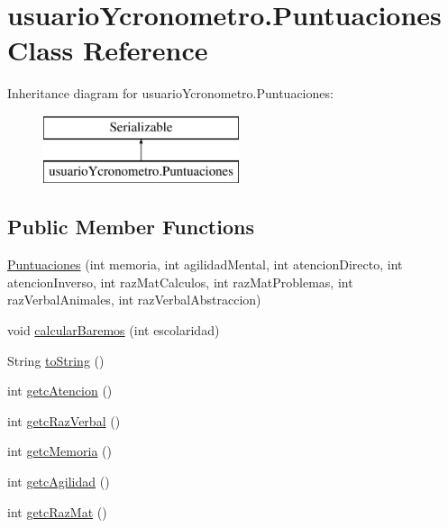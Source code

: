 \hypertarget{classusuario_ycronometro_1_1_puntuaciones}{}\section{usuario\+Ycronometro.\+Puntuaciones Class Reference}
\label{classusuario_ycronometro_1_1_puntuaciones}
Inheritance diagram for usuario\+Ycronometro.\+Puntuaciones\+:\begin{figure}[H]
\begin{center}
\leavevmode
\includegraphics[height=2.000000cm]{classusuario_ycronometro_1_1_puntuaciones}
\end{center}
\end{figure}
\subsection*{Public Member Functions}
\begin{DoxyCompactItemize}
\item 
\mbox{\hyperlink{classusuario_ycronometro_1_1_puntuaciones_ab9b472fcb079cdeb1530c335e5e56ddc}{Puntuaciones}} (int memoria, int agilidad\+Mental, int atencion\+Directo, int atencion\+Inverso, int raz\+Mat\+Calculos, int raz\+Mat\+Problemas, int raz\+Verbal\+Animales, int raz\+Verbal\+Abstraccion)
\item 
void \mbox{\hyperlink{classusuario_ycronometro_1_1_puntuaciones_a9ed35a7af083dda792147918af3f643d}{calcular\+Baremos}} (int escolaridad)
\item 
String \mbox{\hyperlink{classusuario_ycronometro_1_1_puntuaciones_a4af8c17dd95fdf9427c1c7270e0f6f13}{to\+String}} ()
\item 
int \mbox{\hyperlink{classusuario_ycronometro_1_1_puntuaciones_a3a7889b31eaa42d825fb400347cbee11}{getc\+Atencion}} ()
\item 
int \mbox{\hyperlink{classusuario_ycronometro_1_1_puntuaciones_a855a64dd57ba05b2d08c5eb53bd1f4af}{getc\+Raz\+Verbal}} ()
\item 
int \mbox{\hyperlink{classusuario_ycronometro_1_1_puntuaciones_aee981e636be77213d379859273ebfa4a}{getc\+Memoria}} ()
\item 
int \mbox{\hyperlink{classusuario_ycronometro_1_1_puntuaciones_a399e860ec1b7aab2f8555b0d1fa717a5}{getc\+Agilidad}} ()
\item 
int \mbox{\hyperlink{classusuario_ycronometro_1_1_puntuaciones_a68b3c835141f8a67aae78e01cd31d400}{getc\+Raz\+Mat}} ()
\end{DoxyCompactItemize}


